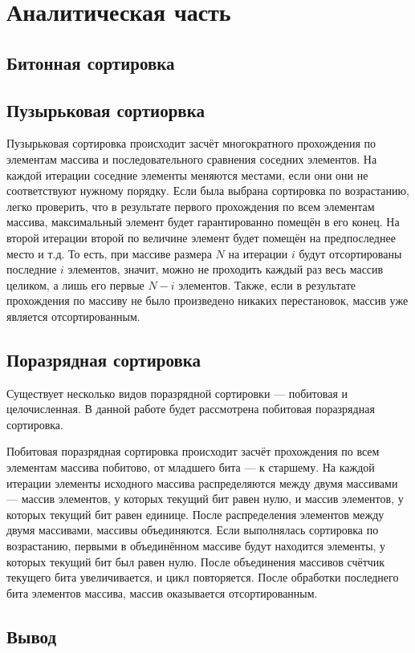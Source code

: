 \section{Аналитическая часть}

\subsection{Битонная сортировка}


\subsection{Пузырьковая сортиорвка}

Пузырьковая сортировка происходит засчёт многократного прохождения по элементам массива и последовательного сравнения соседних элементов.
На каждой итерации соседние элементы меняются местами, если они они не соответствуют нужному порядку.
Если была выбрана сортировка по возрастанию, легко проверить, что в результате первого прохождения по всем элементам массива, максимальный элемент будет гарантированно помещён в его конец.
На второй итерации второй по величине элемент будет помещён на предпоследнее место и т.д.
То есть, при массиве размера $N$ на итерации $i$ будут отсортированы последние $i$ элементов, значит, можно не проходить каждый раз весь массив целиком, а лишь его первые $N - i$ элементов.
Также, если в результате прохождения по массиву не было произведено никаких перестановок, массив уже является отсортированным.

\subsection{Поразрядная сортировка}

Существует несколько видов поразрядной сортировки --- побитовая и целочисленная.
В данной работе будет рассмотрена побитовая поразрядная сортировка.

Побитовая поразрядная сортировка происходит засчёт прохождения по всем элементам массива побитово, от младшего бита --- к старшему.
На каждой итерации элементы исходного массива распределяются между двумя массивами --- массив элементов, у которых текущий бит равен нулю, и массив элементов, у которых текущий бит равен единице.
После распределения элементов между двумя массивами, массивы объединяются.
Если выполнялась сортировка по возрастанию, первыми в объединённом массиве будут находится элементы, у которых текущий бит был равен нулю.
После объединения массивов счётчик текущего бита увеличивается, и цикл повторяется.
После обработки последнего бита элементов массива, массив оказывается отсортированным.

\subsection*{Вывод}

